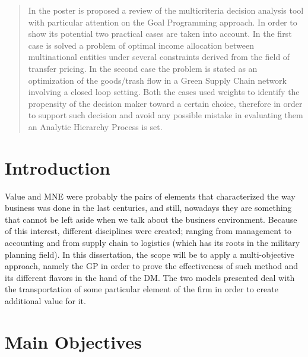 \documentclass[a0,portrait]{a0poster}
\begin{document}
\begin{multicols}{2} %

\color{Navy} %

\begin{abstract}
In the poster is proposed a review of the multicriteria decision analysis tool with particular attention on the Goal Programming approach. In order to show its potential two practical cases are taken into account. In the first case is solved a problem of optimal income allocation between multinational entities under several constraints derived from the field of transfer pricing. In the second case the problem is stated as an optimization of the goods/trash flow in a Green Supply Chain network involving a closed loop setting. Both the cases used weights to identify the propensity of the decision maker toward a certain choice, therefore in order to support such decision and avoid any possible mistake in evaluating them an Analytic Hierarchy Process is set.

\end{abstract}

\color{SaddleBrown} %

\section*{Introduction}
Value and MNE were probably the pairs of elements that characterized the way business was done in the last centuries, and still, nowadays they are something that cannot be left aside when we talk about the business environment. Because of this interest, different disciplines were created; ranging from management to accounting and from supply chain to logistics (which has its roots in the military planning field). In this dissertation, the scope will be to apply a multi-objective approach, namely the GP in order to prove the effectiveness of such method and its different flavors in the hand of the DM. The two models presented deal with the transportation of some particular element of the firm in order to create additional value for it. 


\color{DarkSlateGray} %

\section*{Main Objectives}


\end{multicols}
\end{document}
